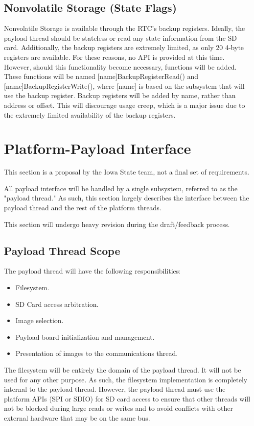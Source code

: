 \documentclass{article}
\begin{document}
\subsection{Nonvolatile Storage (State Flags)}
Nonvolatile Storage is available through the RTC's backup registers.
Ideally, the payload thread should be stateless or read any state information
from the SD card. Additionally, the backup registers are extremely limited, as
only 20 4-byte registers are available. For these reasons, no API is provided
at this time. However, should this functionality become necessary, functions
will be added. These functions will be named [name]BackupRegisterRead()
and [name]BackupRegisterWrite(), where [name] is 
based on the subsystem that will use the backup register.
Backup registers will be added by name, rather than address or offset.
This will discourage usage creep, which is a major issue due to the
extremely limited availability of the backup registers.

\section{Platform-Payload Interface}
This section is a proposal by the Iowa State team, not
a final set of requirements.

All payload interface will be handled by a single subsystem, referred to as the
"payload thread." As such, this section largely describes the interface between
the payload thread and the rest of the platform threads.

This section will undergo heavy revision during the draft/feedback process.

\subsection{Payload Thread Scope}
The payload thread will have the following responsibilities:
\begin{itemize}
    \item Filesystem.
    \item SD Card access arbitration.
    \item Image selection.
    \item Payload board initialization and management.
    \item Presentation of images to the communications thread.
\end{itemize}

The filesystem will be entirely the domain of the payload thread. It will not be
used for any other purpose. As such, the filesystem implementation is completely
internal to the payload thread. However, the payload thread must use the
platform APIs (SPI or SDIO) for SD card access to ensure that other threads will not be blocked
during large reads or writes and to avoid conflicts with other external hardware
that may be on the same bus.
\end{document}
